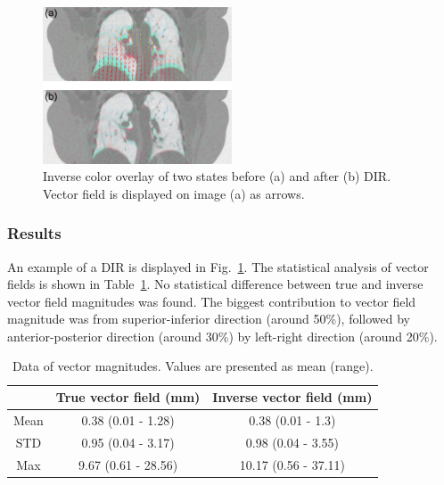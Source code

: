 \newpage

\begin{figure}[H]
	\begin{center}		
		\includegraphics[width=0.5\textwidth]{./Vmm/Images/exampleReg.png}
		\caption{Inverse color overlay of two states before (a) and after (b) DIR. Vector field is displayed on image (a) as arrows.}
		\label{exampleReg_lung}
	\end{center}
\end{figure}


\subsubsection{Results}

An example of a DIR is displayed in Fig.~\ref{exampleReg_lung}. The statistical analysis of vector fields is shown in Table~\ref{tab:vectordata_lung}. No statistical
difference between true and inverse vector field magnitudes was found. The biggest contribution to vector field magnitude was from superior-inferior direction (around 50\%), followed by anterior-posterior direction (around 30\%)
by left-right direction (around 20\%).

\begin{table}[H]
  \centering
  \caption{Data of vector magnitudes. Values are presented as mean (range).}
  \begin{tabular}{|c|c|c|}
  \hline\hline
       & True vector field (mm) & Inverse vector field (mm) \\
       \hline
       Mean & 0.38 (0.01 - 1.28) & 0.38 (0.01 - 1.3) \\ 
       STD & 0.95 (0.04 - 3.17) & 0.98 (0.04 - 3.55) \\ 
       Max & 9.67 (0.61 - 28.56) & 10.17 (0.56 - 37.11) \\
    \hline\hline
  \end{tabular}
  \label{tab:vectordata_lung}
\end{table}

